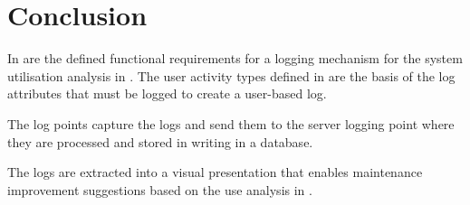 \section{Conclusion}
In  are the defined functional requirements for a logging mechanism for the system utilisation analysis in . The user activity types defined in  are the basis of the log attributes that must be logged to create a user-based log.\par The log points capture the logs and send them to the server logging point where they are processed and stored in writing in a database.\par The logs are extracted into a visual presentation that enables maintenance improvement suggestions based on the use analysis in .